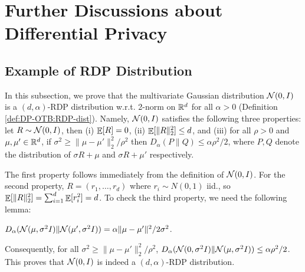 \section{Further Discussions about Differential Privacy}
\label{app:DP-OTB:further-DP}

\subsection{Example of RDP Distribution}

In this subsection, we prove that the multivariate Gaussian distribution ${\cal N}(0,I)$ is a $(d,\alpha)$-RDP distribution w.r.t. 2-norm on $\mathbb R^d$ for all $\alpha>0$ (Definition \ref{def:DP-OTB:RDP-dist}). Namely, ${\cal N}(0,I)$ satisfies the following three properties: let $R\sim {\cal N}(0,I)$, then (i) $\mathop{\mathbb{E}}[R]=0$, (ii) $\mathop{\mathbb{E}}[\|R\|_2^2] \leq d$, and (iii) for all $\rho>0$ and $\mu,\mu'\in\mathbb R^d$, if $\sigma^2 \geq \|\mu-\mu'\|_2^2/\rho^2$ then $D_\alpha(P\|Q) \leq \alpha\rho^2/2$, where $P,Q$ denote the distribution of $\sigma R+\mu$ and $\sigma R+\mu'$ respectively.

The first property follows immediately from the definition of ${\cal N}(0,I)$. For the second property, $R=(r_1,\ldots,r_d)$ where $r_i\sim N(0,1)$ iid., so $\mathop{\mathbb{E}}[\|R\|_2^2]=\sum_{i=1}^d \mathop{\mathbb{E}}[r_i^2]=d$. To check the third property, we need the following lemma:

\begin{lemma}\label{lem:DP-OTB:renyigaussian}
$D_\alpha({\cal N}(\mu,\sigma^2I)\| {\cal N}(\mu',\sigma^2I))=\alpha \|\mu-\mu'\|^2/2\sigma^2$.
\end{lemma}

Consequently, for all $\sigma^2 \geq \|\mu-\mu'\|_2^2/\rho^2$, $D_\alpha({\cal N}(0,\sigma^2I)\| {\cal N}(\mu, \sigma^2 I)) \leq \alpha\rho^2/2$. This proves that ${\cal N}(0,I)$ is indeed a $(d,\alpha)$-RDP distribution.

